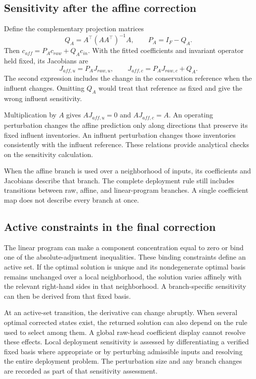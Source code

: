 \subsection{Sensitivity after the affine correction}

Define the complementary projection matrices
\begin{equation}
\label{eq:icsor_projection_matrices}
Q_A=A^\top(AA^\top)^{-1}A,
\qquad P_A=I_F-Q_A.
\end{equation}
Then \(c_{aff}=P_Ac_{raw}+Q_Ac_{in}\). With the fitted coefficients and invariant operator held fixed, its Jacobians are
\begin{equation}
\label{eq:icsor_affine_jacobians}
J_{aff,u}=P_AJ_{raw,u},
\qquad J_{aff,c}=P_AJ_{raw,c}+Q_A.
\end{equation}
The second expression includes the change in the conservation reference when the influent changes. Omitting \(Q_A\) would treat that reference as fixed and give the wrong influent sensitivity.

Multiplication by \(A\) gives \(AJ_{aff,u}=0\) and \(AJ_{aff,c}=A\). An operating perturbation changes the affine prediction only along directions that preserve its fixed influent inventories. An influent perturbation changes those inventories consistently with the influent reference. These relations provide analytical checks on the sensitivity calculation.

When the affine branch is used over a neighborhood of inputs, its coefficients and Jacobians describe that branch. The complete deployment rule still includes transitions between raw, affine, and linear-program branches. A single coefficient map does not describe every branch at once.

\subsection{Active constraints in the final correction}

The linear program can make a component concentration equal to zero or bind one of the absolute-adjustment inequalities. These binding constraints define an active set. If the optimal solution is unique and its nondegenerate optimal basis remains unchanged over a local neighborhood, the solution varies affinely with the relevant right-hand sides in that neighborhood. A branch-specific sensitivity can then be derived from that fixed basis.

At an active-set transition, the derivative can change abruptly. When several optimal corrected states exist, the returned solution can also depend on the rule used to select among them. A global raw-head coefficient display cannot resolve these effects. Local deployment sensitivity is assessed by differentiating a verified fixed basis where appropriate or by perturbing admissible inputs and resolving the entire deployment problem. The perturbation size and any branch changes are recorded as part of that sensitivity assessment.

